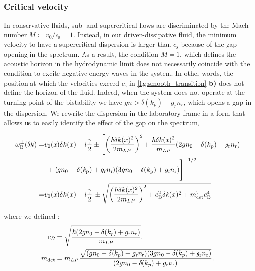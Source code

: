 \subsubsection{Critical velocity} In conservative fluids, sub- and supercritical flows are discriminated by the Mach number $M\coloneqq v_0/c_\mathrm{s}=1$.
Instead, in our driven-dissipative fluid, the minimum velocity to have a supercritical dispersion is larger than $c_\mathrm{s}$ because of the gap opening in the spectrum.
As a result, the condition $M=1$, which defines the acoustic horizon in the hydrodynamic limit does not necessarily coincide with the condition to excite negative-energy waves in the system. In other words, the position at 
which the velocities exceed $c_\mathrm{s}$ in \autoref{fig:smooth_transition} \textbf{b)} does not define the horizon of the fluid. Indeed, when the system does not operate at the turning
point of the bistability we have $gn>\delta(k_p)-g_rn_r$, which opens a gap in the dispersion. We rewrite the dispersion in the laboratory frame in a form that allows us to easily identify the effect of the gap on the spectrum,


\begin{align}\label{eq:lfbogom}
    \omega^\pm_\mathrm{B}(\delta k)=&v_0(x)\delta k(x)-i\frac{\gamma}{2}\nonumber\pm\Biggl[\left(\frac{\hbar\delta k(x)^2}{2 m_{LP}}\right)^2+\frac{\hbar \delta k(x)^2}{m_{LP}}(2g n_0 - \delta(k_\mathrm{p})+g_\mathrm{r}n_\mathrm{r})\\
    &\,\,+(g n_0 - \delta(k_\mathrm{p})+g_\mathrm{r}n_\mathrm{r})(3 g n_0 - \delta(k_\mathrm{p})+g_\mathrm{r}n_\mathrm{r})\Biggr]^{-1/2}\nonumber\\
    =&v_0(x) \delta k(x)-i\frac{\gamma}{2}\,\pm\sqrt{\left(\frac{\hbar\delta k(x)^2}{2 m_{LP}}\right)^2+c_\mathrm{B}^2\delta k(x)^2+m_{\mathrm{det}}^2c_\mathrm{B}^4}
\end{align}

where we defined :
\begin{subequations}
    \label{eq:m_bog}
    \begin{align}
    c_B & = \sqrt{\dfrac{\hbar(2gn_0- \delta(k_p)+g_\mathrm{r}n_\mathrm{r})}{m_{LP}}},\\
    m_{\mathrm{det}}&=m_{LP}\dfrac{\sqrt{(gn_0- \delta(k_p)+g_\mathrm{r}n_\mathrm{r})(3gn_0- \delta(k_p)+g_\mathrm{r}n_\mathrm{r})}}{(2gn_0- \delta(k_p)+g_\mathrm{r}n_\mathrm{r})}.
    \end{align}
\end{subequations}

